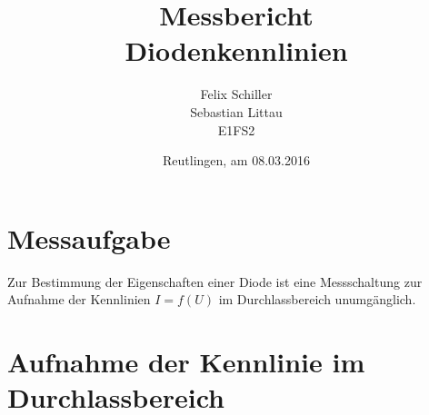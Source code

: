 \documentclass[
a4paper,     %
 headsepline, %
11pt         %
]{scrartcl}  %
\title{Messbericht \\ Diodenkennlinien}
\author{Felix Schiller \\ Sebastian Littau \\ E1FS2}
\date{Reutlingen, am 08.03.2016}
\begin{document}

\maketitle

\newpage
\tableofcontents





\section*{Messaufgabe}
Zur Bestimmung der Eigenschaften einer Diode ist eine Messschaltung zur Aufnahme der Kennlinien $I=f(U)$ im Durchlassbereich unumgänglich. 

\section{Aufnahme der Kennlinie im Durchlassbereich}
\end{document}
